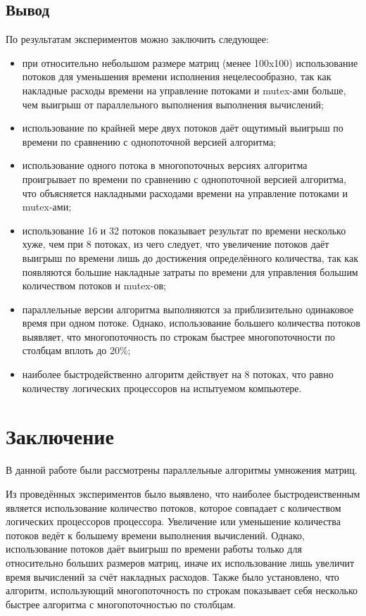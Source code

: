 \documentclass[12pt,a4paper]{report}
\begin{document}
\newpage
\section*{Вывод}

По результатам экспериментов можно заключить следующее:
\begin{itemize}
\item при относительно небольшом размере матриц (менее 100x100) использование потоков для 
уменьшения времени исполнения нецелесообразно, так как накладные расходы времени на 
управление потоками и mutex-ами больше, чем выигрыш от параллельного выполнения выполнения
вычислений;
\item использование по крайней мере двух потоков даёт ощутимый выигрыш по времени по 
сравнению с однопоточной версией алгоритма;
\item использование одного потока в многопоточных версиях алгоритма проигрывает по времени
по сравнению с однопоточной версией алгоритма, что объясняется накладными расходами времени
на управление потоками и mutex-ами;
\item использование 16 и 32 потоков показывает результат по времени несколько хуже, чем при 
8 потоках, из чего следует, что увеличение потоков даёт выигрыш по времени лишь до достижения
определённого количества, так как появляются большие накладные затраты по времени для 
управления большим количеством потоков и mutex-ов;
\item параллельные версии алгоритма выполняются за приблизительно одинаковое время при одном
потоке. Однако, использование большего количества потоков выявляет, что многопоточность по 
строкам быстрее многопоточности по столбцам вплоть до 20\%;
\item наиболее быстродейственно алгоритм действует на 8 потоках, что равно количеству 
логических процессоров на испытуемом компьютере.
\end{itemize}




\newpage
\chapter*{Заключение}


В данной работе были рассмотрены параллельные алгоритмы умножения матриц.

Из проведённых экспериментов было выявлено, что наиболее быстродеиственным является использование
количество потоков, которое совпадает с количеством логических процессоров процессора. 
Увеличение или уменьшение количества потоков ведёт к большему времени выполнения вычислений.
Однако, использование потоков даёт выигрыш по времени работы только для относительно больших
размеров матриц, иначе их использование лишь увеличит время вычислений за счёт накладных
расходов.
Также было установлено, что алгоритм, использующий многопоточность по строкам показывает себя
несколько быстрее алгоритма с многопоточностью по столбцам.
\end{document}
